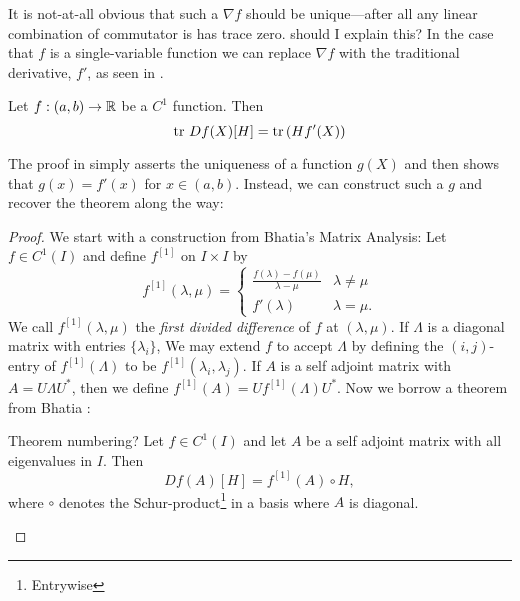 It is not-at-all obvious that such a \(\nabla f \) should be unique---after all
any linear combination of commutator is has trace zero. {\color{red} should I
  explain this?} In the case that \(f\) is a single-variable function we can
replace \(\nabla f\) with the traditional derivative, \(f'\), as seen in
\cite[Thm 3.3]{pascoeTrace2020}.
\begin{theorem}
  Let \(f: (a,b)\to \mathbb{R} \) be a \(C^1\) function. Then
  \[
    \operatorname{tr} \, Df(X)[H] = \operatorname{tr} \left( Hf'(X) \right)
  \]
\end{theorem}

The proof in \cite{pascoeTrace2020} simply asserts the uniqueness of a function
\(g(X)\) and then shows that \(g(x)=f'(x)\) for \(x \in (a,b)\). Instead, we can
construct such a \(g\) and recover the theorem along the way:
\begin{proof}

We start with a construction from Bhatia's Matrix Analysis: Let
$f \in C ^{1} (I)$ and define $f ^{[1]} $ on $I \times I$ by
\[
  f^{[1]} (\lambda,\mu) =
  \begin{cases}
    \frac{f(\lambda) - f(\mu)}{\lambda-\mu} & \lambda \neq \mu \\
    f'(\lambda) & \lambda = \mu.
  \end{cases}
\]
We call $f ^{[1]} (\lambda,\mu)$ the \emph{first divided difference} of $f$ at
$(\lambda,\mu)$. If $\Lambda$ is a diagonal matrix with entries
$\{ \lambda_{i}\} $, We may extend $f$ to accept $\Lambda$ by
defining the $(i,j)$-entry of $f ^{[1]} (\Lambda)$ to be
$f ^{[1]} (\lambda_i,\lambda_j)$. If $A$ is a self adjoint matrix with
$A = U \Lambda U ^{*} $, then we define
$f ^{[1]} (A) = U f ^{[1]} (\Lambda) U ^{*} $. Now we borrow a theorem from
Bhatia \cite{bhatiaMatrixAnalysis1997}:
\begin{theorem}[Bhatia V.3.3]

{\color{red} Theorem numbering?}
  Let $f \in C ^{1} (I)$ and let $A$ be a self adjoint matrix with all
  eigenvalues in $I$. Then \[
    Df(A)[H] = f ^{[1]} (A) \circ H,
  \]
  where $\circ$ denotes the Schur-product\footnote{Entrywise} in a basis where $A$ is diagonal.
\end{theorem}


\end{proof}
